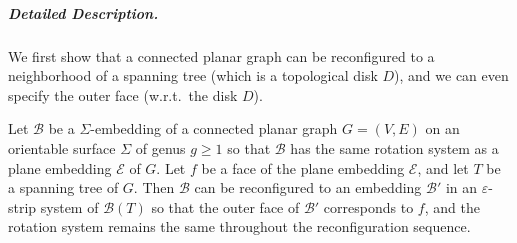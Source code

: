 \documentclass[a4paper,USenglish,cleveref,colorlinks=true,urlcolor=black,linkcolor=black,citecolor=black,thm-restate,authorcolumns]{lipics-v2021}
\theoremstyle{claimstyle}
\begin{document}
\subparagraph{Detailed Description.}
We first show that a connected planar graph can be reconfigured to a neighborhood of a spanning tree (which is a topological disk $D$), and we can even specify the outer face (w.r.t.\ the disk $D$).

\begin{lemma}\label{lem:hug-a-tree}
    Let $\mathcal{B}$ be a $\Sigma$-embedding of a connected planar graph $G = (V,E)$ on an orientable surface $\Sigma$ of genus $g\geq 1$ so that $\mathcal{B}$ has the same rotation system as a plane embedding $\mathcal{E}$ of $G$.
    Let $f$ be a face of the plane embedding $\mathcal{E}$, and let $T$ be a spanning tree of $G$.
    Then $\mathcal{B}$ can be reconfigured to an embedding $\mathcal{B}'$ in
    an $\varepsilon$-strip system of $\mathcal{B}(T)$ so that the outer face of $\mathcal{B}'$ corresponds to $f$, and the rotation system remains the same throughout the reconfiguration sequence.
\end{lemma}
\end{document}
